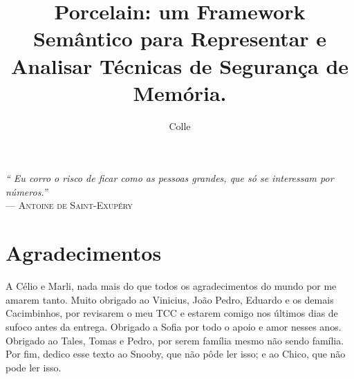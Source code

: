 \documentclass[cic,tc]{iiufrgs}
\title{Porcelain: um Framework Semântico para Representar e Analisar Técnicas de Segurança de Memória.}
\author{Colle}{Pedro Henrique Boniatti}
\begin{document}


\maketitle

 \clearpage
 \begin{flushright}
     \mbox{}\vfill
     {\sffamily\itshape
       ``
       Eu corro o risco de ficar como as pessoas grandes, 
	   que só se interessam por números.''\\
     }
     --- \textsc{Antoine de Saint-Exupéry}
 \end{flushright}

\chapter*{Agradecimentos}
A Célio e Marli, nada mais do que todos os agradecimentos 
do mundo por me amarem tanto. Muito obrigado ao Vinicius, João Pedro, Eduardo e os demais Cacimbinhos, por revisarem o meu TCC e estarem comigo nos últimos dias de sufoco antes da entrega. Obrigado a Sofia por todo o apoio e amor nesses anos. Obrigado ao Tales, Tomas e Pedro, por serem família mesmo não sendo família. Por fim, dedico esse texto ao Snooby, que não pôde ler isso; e ao Chico, que não pode ler isso.
\end{document}
